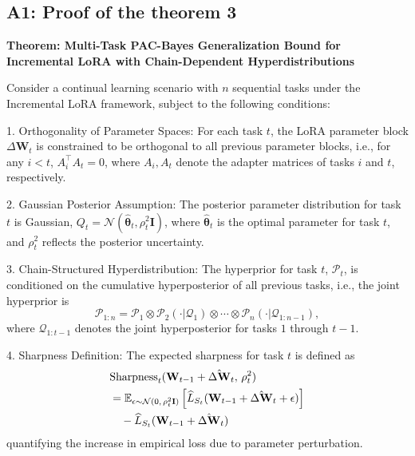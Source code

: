\documentclass[letterpaper]{article} %
\begin{document}
\subsection{A1: Proof of the theorem 3}
\textbf{Theorem: Multi-Task PAC-Bayes Generalization Bound for Incremental LoRA with Chain-Dependent Hyperdistributions}


Consider a continual learning scenario with $n$ sequential tasks under the Incremental LoRA framework, subject to the following conditions:

1. Orthogonality of Parameter Spaces: For each task $t$, the LoRA parameter block $\Delta\mathbf{W}_t$ is constrained to be orthogonal to all previous parameter blocks, i.e., for any $i < t$, $A_i^\top A_t = 0$, where $A_i, A_t$ denote the adapter matrices of tasks $i$ and $t$, respectively.

2. Gaussian Posterior Assumption: The posterior parameter distribution for task $t$ is Gaussian, $Q_t = \mathcal{N}(\hat{\boldsymbol{\theta}}_t, \rho_t^2 \mathbf{I})$, where $\hat{\boldsymbol{\theta}}_t$ is the optimal parameter for task $t$, and $\rho_t^2$ reflects the posterior uncertainty.

3. Chain-Structured Hyperdistribution: The hyperprior for task $t$, $\mathcal{P}_t$, is conditioned on the cumulative hyperposterior of all previous tasks, i.e., the joint hyperprior is
   $$
   \mathcal{P}_{1:n} = \mathcal{P}_1 \otimes \mathcal{P}_2(\cdot|\mathcal{Q}_1) \otimes \cdots \otimes \mathcal{P}_n(\cdot|\mathcal{Q}_{1:n-1}),
   $$ where $\mathcal{Q}_{1:t-1}$ denotes the joint hyperposterior for tasks $1$ through $t-1$.

4. Sharpness Definition: The expected sharpness for task $t$ is defined as
\begin{align}
&\mathrm{Sharpness}_t(\mathbf{W}_{t-1} + \hat{\Delta\mathbf{W}}_t,\, \rho_t^2) \notag\\
& = \mathbb{E}_{\epsilon \sim \mathcal{N}(0,\, \rho_t^2 \mathbf{I})}
\left[ \widehat{L}_{S_t}(\mathbf{W}_{t-1} + \hat{\Delta\mathbf{W}}_t + \epsilon) \right] \notag\\
&\quad - \widehat{L}_{S_t}(\mathbf{W}_{t-1} + \hat{\Delta\mathbf{W}}_t) \notag
\end{align}
quantifying the increase in empirical loss due to parameter perturbation.
\end{document}
